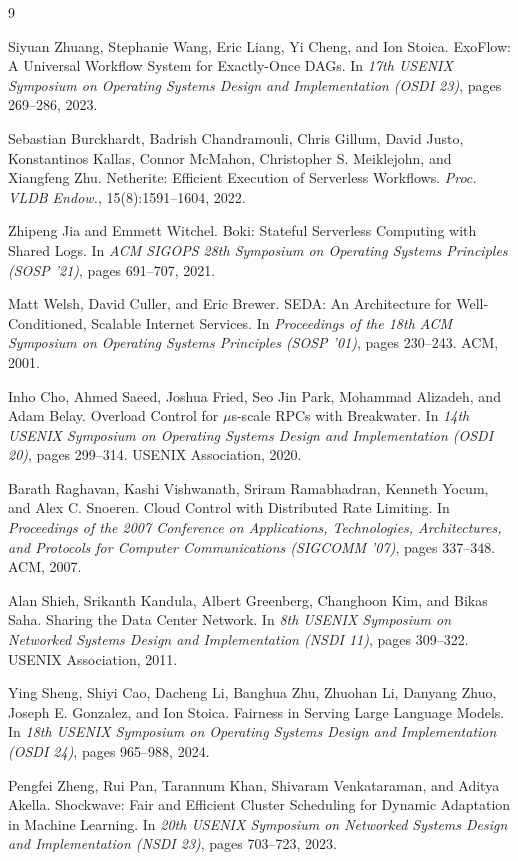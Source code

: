 \documentclass{article}
\begin{document}

\begin{thebibliography}{9}

Siyuan Zhuang, Stephanie Wang, Eric Liang, Yi Cheng, and Ion Stoica.
{ExoFlow}: A Universal Workflow System for {Exactly-Once} {DAGs}.
In \emph{17th USENIX Symposium on Operating Systems Design and Implementation (OSDI 23)}, pages 269--286, 2023.

Sebastian Burckhardt, Badrish Chandramouli, Chris Gillum, David Justo, Konstantinos Kallas, Connor McMahon, Christopher S. Meiklejohn, and Xiangfeng Zhu.
Netherite: Efficient Execution of Serverless Workflows.
\emph{Proc. VLDB Endow.}, 15(8):1591--1604, 2022.

Zhipeng Jia and Emmett Witchel.
Boki: Stateful Serverless Computing with Shared Logs.
In \emph{ACM SIGOPS 28th Symposium on Operating Systems Principles (SOSP '21)}, pages 691--707, 2021.

Matt Welsh, David Culler, and Eric Brewer.
{SEDA}: An Architecture for Well-Conditioned, Scalable Internet Services.
In \emph{Proceedings of the 18th ACM Symposium on Operating Systems Principles (SOSP '01)}, pages 230--243. ACM, 2001.

Inho Cho, Ahmed Saeed, Joshua Fried, Seo Jin Park, Mohammad Alizadeh, and Adam Belay.
Overload Control for $\mu$s-scale {RPCs} with {Breakwater}.
In \emph{14th USENIX Symposium on Operating Systems Design and Implementation (OSDI 20)}, pages 299--314. USENIX Association, 2020.

Barath Raghavan, Kashi Vishwanath, Sriram Ramabhadran, Kenneth Yocum, and Alex C. Snoeren.
Cloud Control with Distributed Rate Limiting.
In \emph{Proceedings of the 2007 Conference on Applications, Technologies, Architectures, and Protocols for Computer Communications (SIGCOMM '07)}, pages 337--348. ACM, 2007.

Alan Shieh, Srikanth Kandula, Albert Greenberg, Changhoon Kim, and Bikas Saha.
Sharing the Data Center Network.
In \emph{8th USENIX Symposium on Networked Systems Design and Implementation (NSDI 11)}, pages 309--322. USENIX Association, 2011.

Ying Sheng, Shiyi Cao, Dacheng Li, Banghua Zhu, Zhuohan Li, Danyang Zhuo, Joseph E. Gonzalez, and Ion Stoica.
Fairness in Serving Large Language Models.
In \emph{18th USENIX Symposium on Operating Systems Design and Implementation (OSDI 24)}, pages 965--988, 2024.

Pengfei Zheng, Rui Pan, Tarannum Khan, Shivaram Venkataraman, and Aditya Akella.
Shockwave: Fair and Efficient Cluster Scheduling for Dynamic Adaptation in Machine Learning.
In \emph{20th USENIX Symposium on Networked Systems Design and Implementation (NSDI 23)}, pages 703--723, 2023.

\end{thebibliography}
\end{document}
